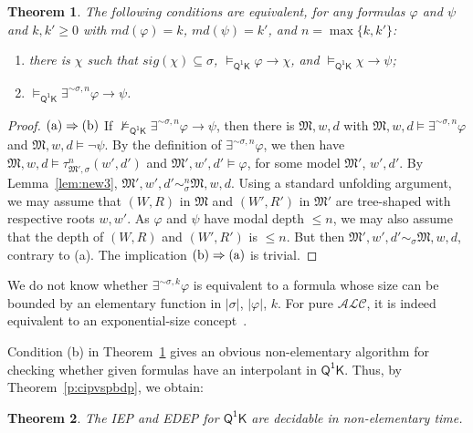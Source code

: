 \documentclass[10pt,a4paper]{amsart}
\theoremstyle{plain}
\newtheorem{thm}{Theorem}[section]
\theoremstyle{definition}
\newcommand{\md}{\textit{md}}
\newcommand{\sig}{\mathit{sig}}
\newcommand{\FOMK}{\ensuremath{\mathsf{Q^1K}}}
\begin{document}
\begin{thm}\label{thm:intK} 
The following conditions are equivalent, for any formulas $\varphi$ and $\psi$ and $k,k'\geq 0$ with $\md(\varphi)=k$, $\md(\psi) = k'$, and $n = \max{\{k,k'\}}$\textup{:}
%
\begin{enumerate}[style=multiline,leftmargin=0.7cm]
\item[\rm\textup{(a)}] there is $\chi$ such that $\sig(\chi) \subseteq \sigma$, $\models_\FOMK \varphi \rightarrow \chi$, and \mbox{$\models_\FOMK \chi \rightarrow \psi$\textup{;}}

\item[\rm\textup{(b)}] $\models_\FOMK \exists^{\sim\sigma,n}\varphi \rightarrow \psi$.
\end{enumerate}
\end{thm}
%
\begin{proof}
${\rm(a)} \Rightarrow {\rm (b)}$ If $\not\models_\FOMK \exists^{\sim\sigma,n}\varphi \rightarrow \psi$, then there is $\mathfrak{M},w, d$ with $\mathfrak{M}, w, d \models \exists^{\sim\sigma,n}\varphi$ and $\mathfrak{M},w, d \models \neg\psi$. By the definition of $\exists^{\sim\sigma,n}\varphi$, we then have $\mathfrak{M},w,d\models \tau_{\mathfrak{M}',\sigma}^{n}(w',d')$ and $\mathfrak{M}',w',d'\models \varphi$, for some model $\mathfrak{M}'$, $w',d'$. By Lemma~\ref{lem:new3}, $\mathfrak{M}',w',d' \sim_{\sigma}^{n} \mathfrak{M},w,d$. Using a standard unfolding argument, we may assume that $(W,R)$ in $\mathfrak M$ and $(W',R')$ in $\mathfrak M'$ are tree-shaped with respective roots $w,w'$. As $\varphi$ and $\psi$ have modal depth $\leq n$, we may also assume that the depth of $(W,R)$ and $(W',R')$ is $\leq n$. But then $\mathfrak{M}',w',d'\sim_{\sigma}\mathfrak{M},w,d$, contrary to (a). The implication ${\rm(b)} \Rightarrow {\rm (a)}$ is trivial.
\end{proof}

We do not know whether $\exists^{\sim\sigma,k}\varphi$ is equivalent to a formula whose size can be bounded by an elementary function in $|\sigma|$, $|\varphi|$, $k$. For pure $\mathcal{ALC}$, it is indeed equivalent to an exponential-size concept~\cite{TenEtAl06}.

Condition (b) in Theorem~\ref{thm:intK} gives an obvious non-elementary algorithm for checking whether given formulas have an interpolant in $\FOMK$. Thus, by Theorem~\ref{p:cipvspbdp}, we obtain:

\begin{thm}
The IEP and EDEP for $\FOMK$ are decidable in non-elementary time.
\end{thm}
\end{document}
